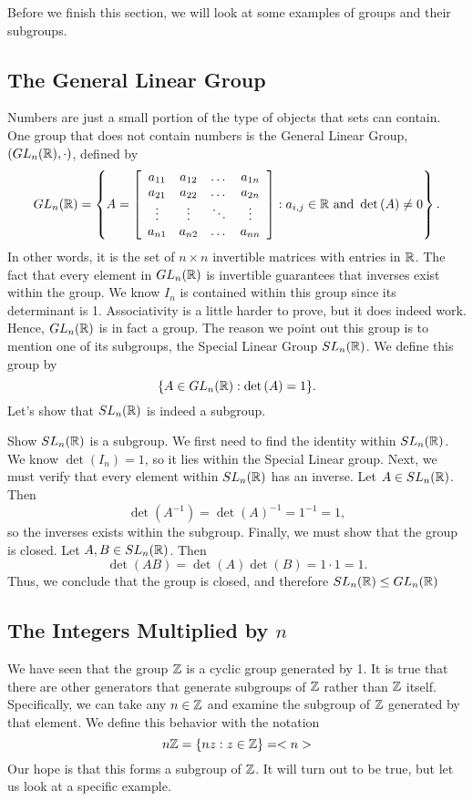 Before we finish this section, we will look at some examples of groups and their subgroups.

\subsection*{The General Linear Group}
Numbers are just a small portion of the type of objects that sets can contain. One group that does not contain numbers is the General Linear Group, $(GL_{n}(\mathbb{R}),\cdot)$, defined by
\[
	GL_{n}(\mathbb{R}) = \left\{
	A=
	\left[
	\begin{array}{c c c c}
		a_{11} & a_{12} & \dots  & a_{1n} \\
		a_{21} & a_{22} & \dots  & a_{2n} \\
		\vdots & \vdots & \ddots & \vdots \\
		a_{n1} & a_{n2} & \dots  & a_{nn}
	\end{array}
	\right]
	:
	a_{i,j}\in\mathbb{R}\text{ and } \det{(A)}\neq 0
	\right\}.
\]
In other words, it is the set of $n\times n$ invertible matrices with entries in $\mathbb{R}$. The fact that every element in $GL_{n}(\mathbb{R})$ is invertible guarantees that inverses exist within the group. We know $I_{n}$ is contained within this group since its determinant is 1. Associativity is a little harder to prove, but it does indeed work. Hence, $GL_{n}(\mathbb{R})$ is in fact a group. The reason we point out this group is to mention one of its subgroups, the Special Linear Group $SL_{n}(\mathbb{R})$. We define this group by
\[
	\{A\in GL_{n}(\mathbb{R}) : \det{(A)}=1\}.
\]
Let's show that $SL_{n}(\mathbb{R})$ is indeed a subgroup.

\begin{example}{Show $SL_{n}(\mathbb{R})$ is a subgroup.}
	We first need to find the identity within $SL_{n}(\mathbb{R})$. We know $\det{(I_{n})}=1$, so it lies within the Special Linear group. Next, we must verify that every element within $SL_{n}(\mathbb{R})$ has an inverse. Let $A\in SL_{n}(\mathbb{R})$. Then
	\[
		\det{(A^{-1})}=\det{(A)}^{-1}=1^{-1}=1,
	\]
	so the inverses exists within the subgroup. Finally, we must show that the group is closed. Let $A,B\in
	SL_{n}(\mathbb{R})$. Then
	\[
		\det{(AB)}=\det{(A)}\det{(B)}=1\cdot 1=1.
	\]
	Thus, we conclude that the group is closed, and therefore $SL_{n}(\mathbb{R})\leq GL_{n}(\mathbb{R})$
\end{example}

\subsection*{The Integers Multiplied by $n$}
We have seen that the group $\mathbb{Z}$ is a cyclic group generated by 1. It is true that there are other generators that generate subgroups of $\mathbb{Z}$ rather than $\mathbb{Z}$ itself. Specifically, we can take any $n\in\mathbb{Z}$ and examine the subgroup of $\mathbb{Z}$ generated by that element. We define this behavior with the notation
\[
	n\mathbb{Z}=\{nz:z\in\mathbb{Z}\} = <n>
\]
Our hope is that this forms a subgroup of $\mathbb{Z}$. It will turn out to be true, but let us look at a specific example.

